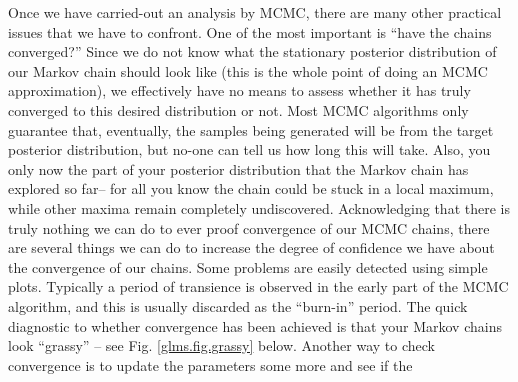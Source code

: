 Once we have carried-out an analysis by MCMC, there are many other
practical issues that we have to confront.  One of the most important
is ``have the chains converged?'' Since we do not know what the stationary posterior distribution of our Markov chain should look like (this is the whole point of doing an MCMC approximation), we effectively have no means to assess whether it has truly converged to this desired distribution or not. Most MCMC algorithms only guarantee
that, eventually, the samples being generated will be from the target
posterior distribution, but no-one can tell us how long this will take. Also, you only now the part of your posterior distribution that the Markov chain has explored so far– for all you know the chain could be stuck in a local maximum, while other maxima remain completely undiscovered.  Acknowledging that there is truly nothing we can do to ever proof convergence of our MCMC chains, there are several things we can do to increase the degree of confidence we have about the convergence of our chains. Some problems are easily detected using simple plots.  Typically a period of transience is
observed in the early part of the MCMC algorithm, and this is usually
discarded as the ``burn-in'' period. The quick diagnostic to whether convergence has been achieved is that
your Markov chains look ``grassy'' -- see Fig.  \ref{glms.fig.grassy}
below.  
Another way to check
convergence is to update the parameters some more and see if the
